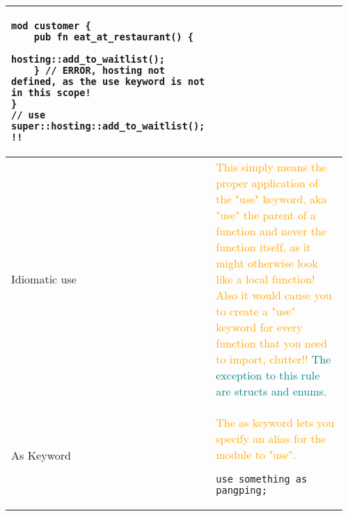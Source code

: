 \documentclass[main.tex,fontsize=8pt,paper=a4,paper=portrait,DIV=calc,]{scrartcl}
\begin{document}
\begin{table}[ht!]
\begin{tabular}{|m{0.2\linewidth}|m{0.755\linewidth}|}
\begin{lstlisting}
mod customer {
    pub fn eat_at_restaurant() {
        hosting::add_to_waitlist();
    } // ERROR, hosting not defined, as the use keyword is not in this scope!
}
// use super::hosting::add_to_waitlist(); !!
\end{lstlisting}\\
\hline
Idiomatic use & 
\textcolor{orange}{This simply means the proper application of the "use" keyword, aka "use" the parent of a function and never the function itself, as it might otherwise look like a local function! \newline
Also it would cause you to create a "use" keyword for every function that you need to import, clutter!!}\newline
\textcolor{teal}{The exception to this rule are structs and enums.}\\
\hline
As Keyword & 
\textcolor{orange}{The as keyword lets you specify an alias for the module to "use".}\newline
\begin{lstlisting}
use something as pangping;
\end{lstlisting}\\
\hline
\end{tabular}
\end{table}
\pagebreak
\end{document}
